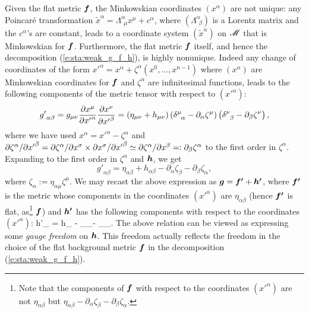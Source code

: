 Given the flat metric $\bm{f}$, the Minkowskian coordinates $(x^\alpha)$
are not unique: any Poincaré transformation\label{p:sta:Poincare_transf}
${\tilde x}^\alpha = \Lambda^\alpha_{\ \, \mu} x^\mu + c^\alpha$, where
$(\Lambda^\alpha_{\ \, \beta})$ is a Lorentz matrix and the $c^\alpha$'s are
constant, leads to a coordinate system $({\tilde x}^\alpha)$ on $\mathscr{M}$ that is Minkowskian for $\bm{f}$.
Furthermore, the flat metric $\bm{f}$ itself, and hence the decomposition (\ref{e:sta:weak_g_f_h}), is
highly nonunique.
Indeed any change of coordinates of the form ${x'}^\alpha = x^\alpha + \zeta^\alpha(x^0,\ldots,x^{n-1})$
where $(x^\alpha)$ are Minkowskian coordinates for $\bm{f}$ and $\zeta^\alpha$ are infinitesimal functions,
leads to the following components of the metric tensor with respect to $({x'}^\alpha)$:
\[
    {g'}_{\alpha\beta} = g_{\mu\nu} \frac{\partial x^\mu}{\partial {x'}^\alpha} \frac{\partial x^\nu}{\partial {x'}^\beta}
    = \left( \eta_{\mu\nu} + h_{\mu\nu}\right) \left( \delta^\mu_{\ \, \alpha} - \partial_\alpha \zeta^\mu \right)
     \left( \delta^\nu_{\ \, \beta} - \partial_\beta \zeta^\nu \right) ,
\]
where we have used $x^\alpha = {x'}^\alpha - \zeta^\alpha$
and ${\partial \zeta^\alpha}/{\partial {x'}^\beta} = {\partial \zeta^\alpha}/{\partial x^\sigma} \times {\partial x^\sigma}/{\partial {x'}^\beta} \simeq
{\partial \zeta^\alpha}/{\partial x^\beta} =: \partial_\beta \zeta^\alpha$ to the first order in $\zeta^\alpha$.
Expanding to the first order in $\zeta^\alpha$ and $\bm{h}$, we get
\[
    {g'}_{\alpha\beta}  = \eta_{\alpha\beta} + h_{\alpha\beta}
    - \partial_\alpha \zeta_\beta - \partial_\beta \zeta_\alpha ,
\]
where $\zeta_\alpha := \eta_{\alpha\mu} \zeta^\mu$.
We may recast the above expression as
$\bm{g} = \bm{f'} + \bm{h'}$,
where $\bm{f'}$ is the metric whose components in the coordinates $({x'}^\alpha)$ are
$\eta_{\alpha\beta}$ (hence $\bm{f'}$ is flat, as\footnote{Note that
the components of $\bm{f}$ with respect to the coordinates $({x'}^\alpha)$ are not $\eta_{\alpha\beta}$
but $\eta_{\alpha\beta} - \partial_\alpha \zeta_\beta - \partial_\beta \zeta_\alpha$.} $\bm{f}$)
and $\bm{h'}$ has the following components with respect to the coordinates $({x'}^\alpha)$:
\be \label{e:sta:hprime_h_zeta}
    {h'}_{\alpha\beta} = h_{\alpha\beta} - \partial_\alpha \zeta_\beta - \partial_\beta \zeta_\alpha .
\ee
The above relation can be viewed as expressing some \emph{gauge freedom} on
$\bm{h}$. This freedom actually reflects the freedom in the choice of the flat background metric $\bm{f}$ in the
decomposition (\ref{e:sta:weak_g_f_h}).

